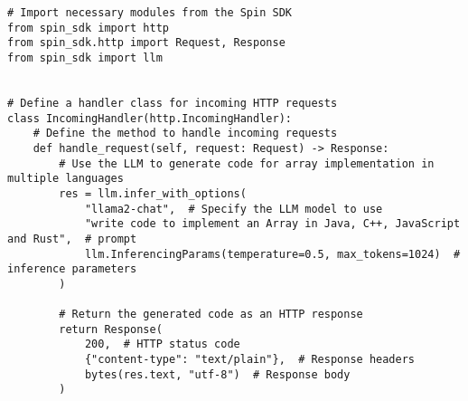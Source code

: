 \begin{verbatim}
# Import necessary modules from the Spin SDK
from spin_sdk import http
from spin_sdk.http import Request, Response
from spin_sdk import llm


# Define a handler class for incoming HTTP requests
class IncomingHandler(http.IncomingHandler):
    # Define the method to handle incoming requests
    def handle_request(self, request: Request) -> Response:
        # Use the LLM to generate code for array implementation in multiple languages
        res = llm.infer_with_options(
            "llama2-chat",  # Specify the LLM model to use
            "write code to implement an Array in Java, C++, JavaScript and Rust",  # prompt
            llm.InferencingParams(temperature=0.5, max_tokens=1024)  # inference parameters
        )
        
        # Return the generated code as an HTTP response
        return Response(
            200,  # HTTP status code
            {"content-type": "text/plain"},  # Response headers
            bytes(res.text, "utf-8")  # Response body
        )
\end{verbatim}